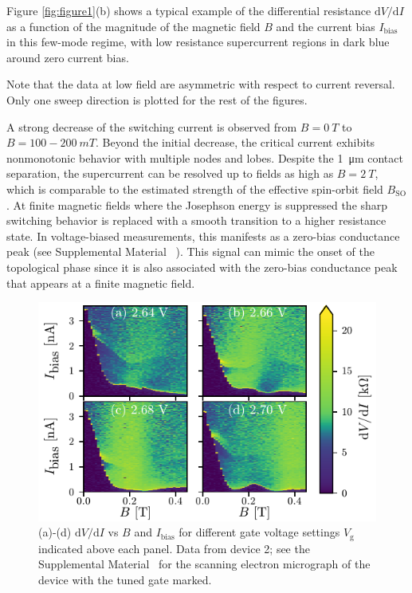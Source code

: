 Figure \ref{fig:figure1}(b) shows a typical example of the differential resistance $\mathrm{d}V/\mathrm{d}I$ as a function of the magnitude of the magnetic field $B$ and the current bias $I_\mathrm{bias}$ in this few-mode regime, with low resistance supercurrent regions in dark blue around zero current bias. 

Note that the data at low field are asymmetric with respect to current reversal. Only one sweep direction is plotted for the rest of the figures.

A strong decrease of the switching current is observed from $B=\SI{0}{T}$ to $B=100-\SI{200}{mT}$. 
Beyond the initial decrease, the critical current exhibits nonmonotonic behavior with multiple nodes and lobes. 
Despite the \SI{1}{\micro \meter} contact separation, the supercurrent can be resolved up to fields as high as $B=\SI{2}{T}$, which is comparable to the estimated strength of the effective spin-orbit field $B_\mathrm{SO}$.
At finite magnetic fields where the Josephson energy is suppressed the sharp switching behavior is replaced with a smooth transition to a higher resistance state. 
In voltage-biased measurements, this manifests as a zero-bias conductance peak (see Supplemental Material ~\cite{supp}). 
This signal can mimic the onset of the topological phase since it is also associated with the zero-bias conductance peak that appears at a finite magnetic field.

\begin{figure}[t]
\includegraphics[width=\columnwidth]{figures/fig2.pdf}
\caption{(a)-(d) $\mathrm{d}V/\mathrm{d}I$ vs $B$ and $I_\mathrm{bias}$ for different gate voltage settings $V_\mathrm{g}$ indicated above each panel.  Data from device 2; see the Supplemental Material~\cite{supp} for the scanning electron micrograph of the device with the tuned gate marked.}
\label{fig:figure2}
\end{figure}

